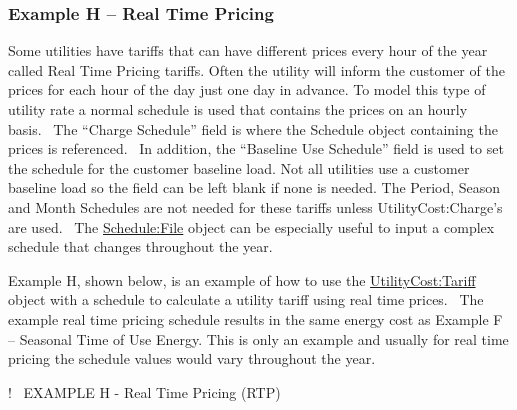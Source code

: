 \subsubsection{Example H -- Real Time Pricing}\label{example-h-real-time-pricing}

Some utilities have tariffs that can have different prices every hour of the year called Real Time Pricing tariffs. Often the utility will inform the customer of the prices for each hour of the day just one day in advance. To model this type of utility rate a normal schedule is used that contains the prices on an hourly basis.~ The ``Charge Schedule'' field is where the Schedule object containing the prices is referenced.~ In addition, the ``Baseline Use Schedule'' field is used to set the schedule for the customer baseline load. Not all utilities use a customer baseline load so the field can be left blank if none is needed. The Period, Season and Month Schedules are not needed for these tariffs unless UtilityCost:Charge's are used.~ The \hyperref[schedulefile]{Schedule:File} object can be especially useful to input a complex schedule that changes throughout the year.

Example H, shown below, is an example of how to use the \hyperref[utilitycosttariff]{UtilityCost:Tariff} object with a schedule to calculate a utility tariff using real time prices.~ The example real time pricing schedule results in the same energy cost as Example F -- Seasonal Time of Use Energy. This is only an example and usually for real time pricing the schedule values would vary throughout the year.

!~ EXAMPLE H - Real Time Pricing (RTP)

